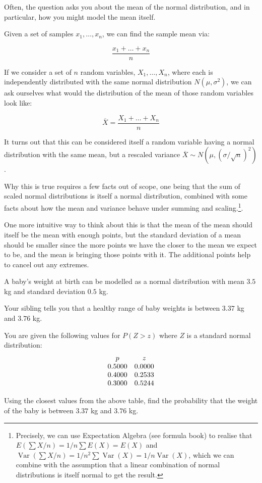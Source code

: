 Often, the question asks you about the mean of the normal distribution, and in particular, how you might model the mean itself.

Given a set of samples $x_1, \dots, x_n$, we can find the sample mean via:

\[ \frac{x_1 + \dots + x_n}{n} \]

If we consider a set of $n$ random variables, $X_1, \dots, X_n$, where each is independently distributed with the same normal distribution $N(\mu, \sigma^2)$, 
we can ask ourselves what would the distribution of the mean of those random variables look like:

\[ \overline{X} = \frac{X_1 + \dots + X_n}{n}\]

It turns out that this can be considered itself a random variable having a normal distribution with the same mean, but a rescaled variance $\overline{X} \sim N(\mu, (\sigma/\sqrt{n})^2)$.

Why this is true requires a few facts out of scope, one being that the sum of scaled normal distributions is itself a normal distribution, combined with some facts about how the mean and variance behave under summing and scaling.\footnote{Precisely, we can use Expectation Algebra (see formula book) to realise that $E(\sum X/n) = 1/n\sum E(X) = E(X)$ and $\operatorname{Var}(\sum X/n) = 1/n^2 \sum \operatorname{Var}(X) = 1/n \operatorname{Var}(X)$, which we can combine with the assumption that a linear combination of normal distributions is itself normal to get the result.}.

One more intuitive way to think about this is that the mean of the mean should itself be the mean with enough points, but the standard deviation of a mean should be smaller since the more points we have the closer to the mean we expect to be, and the mean is bringing those points with it. The additional points help to cancel out any extremes.

\begin{example}
    A baby's weight at birth can be modelled as a normal distribution with mean $3.5$ kg and standard deviation $0.5$ kg. 

    Your sibling tells you that a healthy range of baby weights is between $3.37$ kg and $3.76$ kg.

    You are given the following values for $P(Z>z)$ where $Z$ is a standard normal distribution:
    \[
    \begin{array}{c c}
    p & z \\
    0.5000 & 0.0000 \\
    0.4000 & 0.2533 \\
    0.3000 & 0.5244
    \end{array}
    \]

    Using the closest values from the above table, find the probability that the weight of the baby is between $3.37$ kg and $3.76$ kg.
\end{example}

